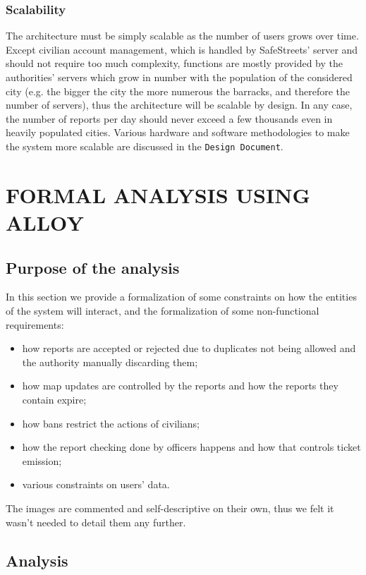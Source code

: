 \documentclass[12pt,a4paper]{article}
\begin{document}
\subsubsection{Scalability}
The architecture must be simply scalable as the number of users grows over time. Except civilian account management, which is handled by SafeStreets' server and should not require too much complexity, functions are mostly provided by the authorities' servers which grow in number with the population of the considered city (e.g. the bigger the city the more numerous the barracks, and therefore the number of servers), thus the architecture will be scalable by design. In any case, the number of reports per day should never exceed a few thousands even in heavily populated cities. Various hardware and software methodologies to make the system more scalable are discussed in the \texttt{Design Document}.
\newpage
\section{FORMAL ANALYSIS USING ALLOY}
\subsection{Purpose of the analysis}
In this section we provide a formalization of some constraints on how the entities of the system will interact, and the formalization of some non-functional requirements:
\begin{itemize}
 \item how reports are accepted or rejected due to duplicates not being allowed and the authority manually discarding them;
 \item how map updates are controlled by the reports and how the reports they contain expire;
 \item how bans restrict the actions of civilians;
 \item how the report checking done by officers happens and how that controls ticket emission;
 \item various constraints on users' data.
\end{itemize}
The images are commented and self-descriptive on their own, thus we felt it wasn't needed to detail them any further.
\newpage
\subsection{Analysis}
\end{document}
